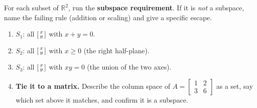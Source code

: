 \documentclass[10pt]{article}
\begin{document}
\begin{tcolorbox}[colback=white, colframe=black!40, title=\textbf{Tier A --- Approaching Proficiency},
    fonttitle=\bfseries, arc=1.5mm, left=3mm, right=3mm, top=2mm, bottom=2mm, breakable]
For each subset of $\mathbb{R}^2$, run the \textbf{subspace requirement}. If it is \emph{not} a
subspace, name the failing rule (addition or scaling) and give a specific escape.
\begin{enumerate}[leftmargin=1.7em, itemsep=9pt]
  \item $S_1$: all $\begin{bsmallmatrix} x\\y \end{bsmallmatrix}$ with $x+y=0$. 
  \item $S_2$: all $\begin{bsmallmatrix} x\\y \end{bsmallmatrix}$ with $x\ge 0$ (the right half-plane). 
  \item $S_3$: all $\begin{bsmallmatrix} x\\y \end{bsmallmatrix}$ with $xy=0$ (the union of the two axes). 
  \item \textbf{Tie it to a matrix.} Describe the column space of $A=\begin{bmatrix} 1 & 2 \\ 3 & 6 \end{bmatrix}$
        as a set, say which set above it matches, and confirm it is a subspace. 
\end{enumerate}
\end{tcolorbox}
\end{document}
